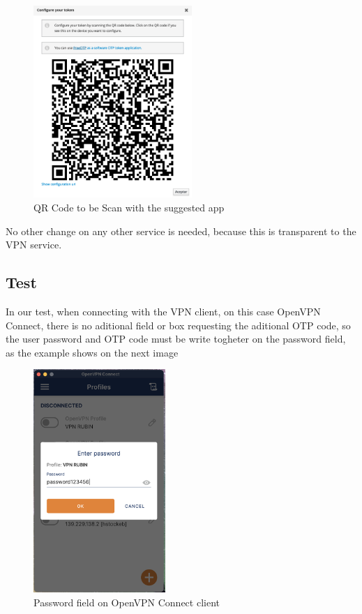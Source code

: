 \newpage

\begin{figure}
    \centering
    \includegraphics[width=60mm]{images/qr_code.png}
    \caption{QR Code to be Scan with the suggested app}
    \label{fig:label}
\end{figure}

No other change on any other service is needed, because this is transparent to the VPN service.

\newpage
\subsection{Test}

In our test, when connecting with the VPN client, on this case OpenVPN Connect, there is no aditional field or box requesting the aditional OTP code, so the user password and OTP code must be write togheter on the password field, as the example shows on the next image

\begin{figure}
    \centering
    \includegraphics[width=50mm]{images/vpn_password.png}
    \caption{Password field on OpenVPN Connect client}
    \label{fig:label}
\end{figure}

